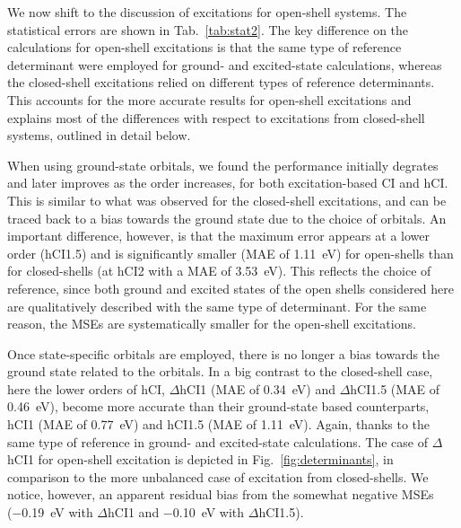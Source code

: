 \documentclass[aip,jcp,reprint,noshowkeys,superscriptaddress]{revtex4-1}
\begin{document}
We now shift to the discussion of excitations for open-shell systems.
The statistical errors are shown in Tab.~\ref{tab:stat2}.
The key difference on the calculations for open-shell excitations is that the same type of reference determinant were employed for ground- and excited-state calculations,
whereas the closed-shell excitations relied on different types of reference determinants.
This accounts for the more accurate results for open-shell excitations and explains most of the differences with respect to excitations from closed-shell systems, outlined in detail below.


When using ground-state orbitals, we found the performance initially degrates and later improves as the order increases, for both excitation-based CI and hCI.
This is similar to what was observed for the closed-shell excitations, 
and can be traced back to a bias towards the ground state due to the choice of orbitals.
An important difference, however, is that the maximum error appears at a lower order (hCI1.5) and is significantly smaller (MAE of \SI{1.11}{\eV}) for open-shells
than for closed-shells (at hCI2 with a MAE of \SI{3.53}{\eV}).
This reflects the choice of reference, since both ground and excited states of the open shells considered here are qualitatively described with the same type of determinant.
For the same reason, the MSEs are systematically smaller for the open-shell excitations.

Once state-specific orbitals are employed, there is no longer a bias towards the ground state related to the orbitals.
In a big contrast to the closed-shell case, here the lower orders of hCI, $\Delta$hCI1 (MAE of \SI{0.34}{\eV}) and $\Delta$hCI1.5 (MAE of \SI{0.46}{\eV}), 
become more accurate than their ground-state based counterparts, hCI1 (MAE of \SI{0.77}{\eV}) and hCI1.5 (MAE of \SI{1.11}{\eV}).
Again, thanks to the same type of reference in ground- and excited-state calculations.
The case of $\Delta$hCI1 for open-shell excitation is depicted in Fig.~\ref{fig:determinants}, in comparison to the more unbalanced case of excitation from closed-shells.
We notice, however, an apparent residual bias from the somewhat negative MSEs (\SI{-0.19}{\eV} with $\Delta$hCI1 and \SI{-0.10}{\eV} with $\Delta$hCI1.5).
\end{document}
